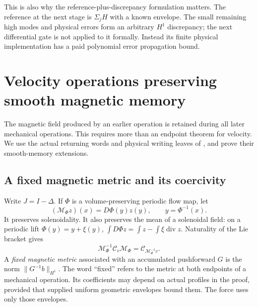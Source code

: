 \documentclass[11pt,a4paper]{amsart}
\theoremstyle{definition}
\theoremstyle{remark}
\numberwithin{equation}{section}
\newcommand{\Ccal}{\mathcal C}
\newcommand{\Mcal}{\mathcal M}
\newcommand{\norm}[1]{\lVert #1\rVert}
\newcommand{\diver}{\operatorname{div}}
\begin{document}
This is also why the reference-plus-discrepancy formulation matters.
The reference at the next stage is $\Sigma_jH$ with a known envelope.
The small remaining high modes and physical errors form an arbitrary $H^1$
discrepancy; the next differential gate is not applied to it formally.
Instead its finite physical implementation has a paid polynomial error
propagation bound.

\section{Velocity operations preserving smooth magnetic memory}\label{sec:memory}
The magnetic field produced by an earlier operation is retained during all
later mechanical operations.  This requires more than an endpoint theorem
for velocity.  We use the actual returning words and physical writing
leaves of \cite{Common}, and prove their smooth-memory extensions.

\subsection{A fixed magnetic metric and its coercivity}
Write $J=I-\Delta$.  If $\Phi$ is a volume-preserving periodic flow map, let
\[
 (\Mcal_\Phi z)(x)=D\Phi(y)z(y),\qquad y=\Phi^{-1}(x).
\]
It preserves solenoidality.  It also preserves the mean of a solenoidal
field: on a periodic lift $\Phi(y)=y+\xi(y)$,
$\int D\Phi z=\int z-\int\xi\diver z$.  Naturality of the Lie bracket gives
\begin{equation}\label{eq:memory-naturality}
 \Mcal_\Phi^{-1}\Ccal_v\Mcal_\Phi
       =\Ccal_{\Mcal_\Phi^{-1}v}.
\end{equation}
A \emph{fixed magnetic metric} associated with an accumulated pushforward
$G$ is the norm $\norm{G^{-1}b}_{H^1}$.  The word ``fixed'' refers to the
metric at both endpoints of a mechanical operation.  Its coefficients may
depend on actual profiles in the proof, provided that supplied uniform
geometric envelopes bound them.  The force uses only those envelopes.
\end{document}
